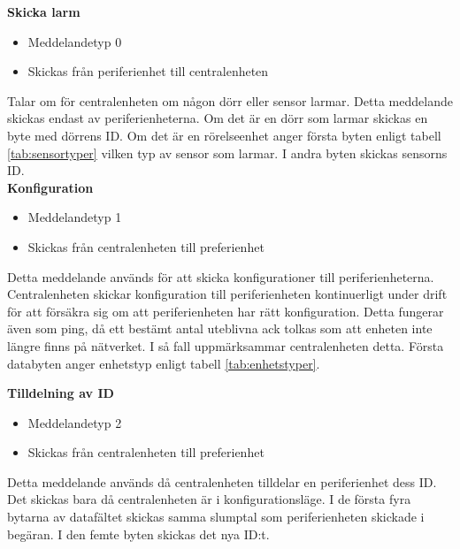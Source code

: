\textbf{Skicka larm}
\begin{itemize}
    \item Meddelandetyp 0
    \item Skickas från periferienhet till centralenheten
\end{itemize}
Talar om för centralenheten om någon dörr eller sensor larmar. Detta meddelande skickas endast av periferienheterna. Om det är en dörr som larmar skickas en byte med dörrens ID. Om det är en rörelseenhet anger första byten enligt tabell \ref{tab:sensortyper} vilken typ av sensor som larmar. I andra byten skickas sensorns ID.\\


\textbf{Konfiguration}
\begin{itemize}
    \item Meddelandetyp 1
    \item Skickas från centralenheten till preferienhet
\end{itemize}
Detta meddelande används för att skicka konfigurationer till periferienheterna.
Centralenheten skickar konfiguration till periferienheten kontinuerligt under drift för att försäkra sig om att periferienheten har rätt konfiguration. Detta fungerar även som ping, då ett bestämt antal uteblivna ack tolkas som att enheten inte längre finns på nätverket.
I så fall uppmärksammar centralenheten detta.
Första databyten anger enhetstyp enligt tabell \ref{tab:enhetstyper}.


\textbf{Tilldelning av ID}
\begin{itemize}
    \item Meddelandetyp 2
    \item Skickas från centralenheten till preferienhet
\end{itemize}
Detta meddelande används då centralenheten tilldelar en periferienhet dess ID. Det skickas bara då centralenheten är i konfigurationsläge. I de första fyra bytarna av datafältet skickas samma slumptal som periferienheten skickade i begäran. I den femte byten skickas det nya ID:t. \\


